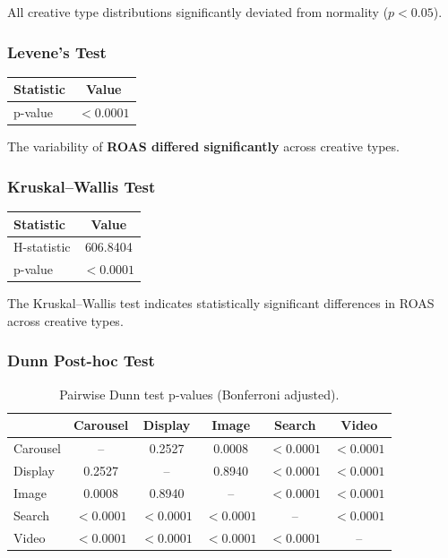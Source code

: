 All creative type distributions significantly deviated from normality ($p<0.05$).

\vspace{0.3cm}

\subsubsection{Levene's Test}

\begin{table}[H]
	\centering
	\begin{tabular}{lc}
		\toprule
		Statistic & Value \\
		\midrule
		p-value & $<0.0001$ \\
		\bottomrule
	\end{tabular}
\end{table}

The variability of \textbf{ROAS differed significantly} across creative types.

\vspace{0.3cm}

\subsubsection{Kruskal--Wallis Test}

\begin{table}[H]
	\centering
	\begin{tabular}{lc}
		\toprule
		Statistic & Value \\
		\midrule
		H-statistic & 606.8404 \\
		p-value & $<0.0001$ \\
		\bottomrule
	\end{tabular}
\end{table}

The Kruskal--Wallis test indicates statistically significant differences in ROAS across creative types.

\vspace{0.3cm}

\subsubsection{Dunn Post-hoc Test}

\begin{table}[H]
	\centering
	\caption{Pairwise Dunn test p-values (Bonferroni adjusted).}
	\begin{tabular}{lccccc}
		\toprule
		& Carousel & Display & Image & Search & Video \\
		\midrule
		Carousel & -- & 0.2527 & 0.0008 & $<0.0001$ & $<0.0001$ \\
		Display & 0.2527 & -- & 0.8940 & $<0.0001$ & $<0.0001$ \\
		Image & 0.0008 & 0.8940 & -- & $<0.0001$ & $<0.0001$ \\
		Search & $<0.0001$ & $<0.0001$ & $<0.0001$ & -- & $<0.0001$ \\
		Video & $<0.0001$ & $<0.0001$ & $<0.0001$ & $<0.0001$ & -- \\
		\bottomrule
	\end{tabular}
\end{table}

